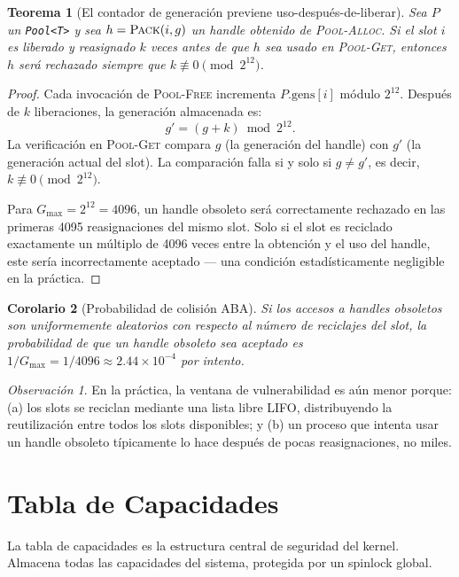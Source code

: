 \documentclass[11pt,twoside,openright]{book}
\theoremstyle{definition}
\theoremstyle{plain}
\newtheorem{theorem}{Teorema}[chapter]
\newtheorem{corollary}[theorem]{Corolario}
\theoremstyle{remark}
\newtheorem{remark}{Observación}[chapter]
\newcommand{\genmax}{G_{\max}}
\begin{document}
\begin{theorem}[El contador de generación previene uso-después-de-liberar]
\label{thm:aba}
Sea $P$ un \texttt{Pool<T>} y sea $h = \textsc{Pack}(i, g)$ un handle obtenido de
\textsc{Pool-Alloc}. Si el slot $i$ es liberado y reasignado $k$ veces antes de que
$h$ sea usado en \textsc{Pool-Get}, entonces $h$ será rechazado siempre que
$k \not\equiv 0 \pmod{2^{12}}$.
\end{theorem}

\begin{proof}
Cada invocación de \textsc{Pool-Free} incrementa $P.\text{gens}[i]$ módulo $2^{12}$.
Después de $k$ liberaciones, la generación almacenada es:
\[
    g' = (g + k) \bmod 2^{12}.
\]
La verificación en \textsc{Pool-Get} compara $g$ (la generación del handle) con $g'$
(la generación actual del slot). La comparación falla si y solo si $g \neq g'$, es decir,
$k \not\equiv 0 \pmod{2^{12}}$.

Para $\genmax = 2^{12} = 4096$, un handle obsoleto será correctamente rechazado en las
primeras 4095 reasignaciones del mismo slot. Solo si el slot es reciclado exactamente
un múltiplo de 4096 veces entre la obtención y el uso del handle, este sería incorrectamente
aceptado --- una condición estadísticamente negligible en la práctica.
\end{proof}

\begin{corollary}[Probabilidad de colisión ABA]
\label{cor:aba-prob}
Si los accesos a handles obsoletos son uniformemente aleatorios con respecto al número de
reciclajes del slot, la probabilidad de que un handle obsoleto sea aceptado es
$1/\genmax = 1/4096 \approx 2.44 \times 10^{-4}$ por intento.
\end{corollary}

\begin{remark}
En la práctica, la ventana de vulnerabilidad es aún menor porque:
(a) los slots se reciclan mediante una lista libre LIFO, distribuyendo la reutilización
entre todos los slots disponibles; y
(b) un proceso que intenta usar un handle obsoleto típicamente lo hace después de pocas
reasignaciones, no miles.
\end{remark}

\section{Tabla de Capacidades}

La tabla de capacidades es la estructura central de seguridad del kernel. Almacena todas
las capacidades del sistema, protegida por un spinlock global.
\end{document}
